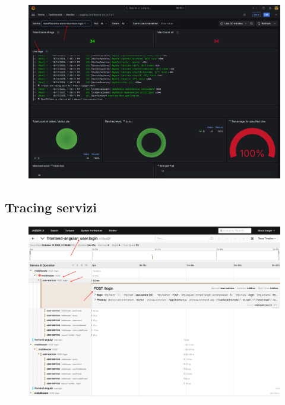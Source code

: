  \begin{figure}[!htb]
    \centering 
    \includegraphics[width=16cm]{report/img/logging-service.png}
    \caption{}
    \label{log_tracing}
\end{figure}

\newpage
\subsection{Tracing servizi}

\begin{figure}[!htb]
    \centering 
    \includegraphics[width=16cm]{report/img/Jaeger-UI.png}
    \caption{}
    \label{service_tracing}
\end{figure}
\newpage